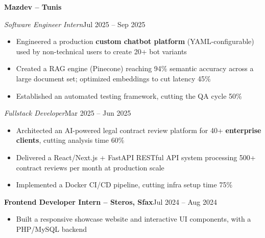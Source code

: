 \documentclass[10pt,a4paper]{article}
\newcommand{\entry}[2]{\vspace{1pt}\noindent\textbf{#1}\hfill{\color{muted}#2}\par}
\newcommand{\subentry}[2]{\noindent\textit{#1}\hfill{\color{muted}#2}\par}
\begin{document}
\entry{Mazdev -- Tunis}{}
\subentry{Software Engineer Intern}{Jul 2025 -- Sep 2025}
\begin{itemize}
  \item Engineered a production \textbf{custom chatbot platform} (YAML-configurable) used by non-technical users to create 20+ bot variants
  \item Created a RAG engine (Pinecone) reaching 94\% semantic accuracy across a large document set; optimized embeddings to cut latency 45\%
  \item Established an automated testing framework, cutting the QA cycle 50\%
\end{itemize}
\subentry{Fullstack Developer}{Mar 2025 -- Jun 2025}
\begin{itemize}
  \item Architected an AI-powered legal contract review platform for 40+ \textbf{enterprise clients}, cutting analysis time 60\%
  \item Delivered a React/Next.js + FastAPI RESTful API system processing 500+ contract reviews per month at production scale
  \item Implemented a Docker CI/CD pipeline, cutting infra setup time 75\%
\end{itemize}

\entry{Frontend Developer Intern -- Steros, Sfax}{Jul 2024 -- Aug 2024}
\begin{itemize}
  \item Built a responsive showcase website and interactive UI components, with a PHP/MySQL backend
\end{itemize}
\end{document}
